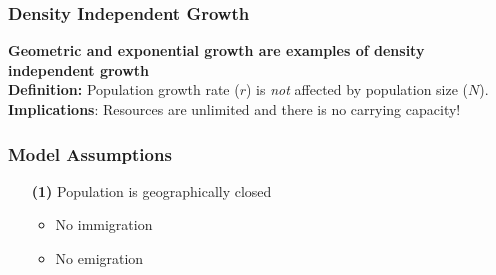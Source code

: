 \documentclass[color=usenames,dvipsnames]{beamer}\usepackage[]{graphicx}\usepackage[]{xcolor}
\begin{document}
\begin{frame}
  \frametitle{Density Independent Growth}
  \large
  \textbf{Geometric and exponential growth are examples of \alert{\bf
      density independent} growth} \\
  \vspace{0.5cm}
  \pause
  \textbf{Definition:} Population growth rate ($r$) is \textit{not} affected by
    population size ($N$). \\
  \pause
  \vspace{0.5cm}
  \textbf{Implications}:  Resources are unlimited and there is no carrying capacity!
\end{frame}








\begin{frame}
  \frametitle{Model Assumptions}
  \large
  \begin{itemize}
  \item[{\color{beamer@blendedblue} \bf (1)}] {Population is geographically closed}
    \begin{itemize}
      \large
      \item No immigration
      \item No emigration
    \end{itemize}
  \end{itemize}
\end{frame}
\end{document}
